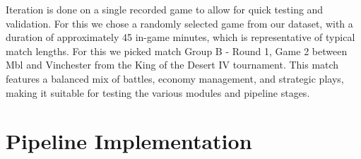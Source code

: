 Iteration is done on a single recorded game to allow for quick testing and validation. For this we chose a randomly selected game from our dataset, with a duration of approximately 45 in-game minutes, which is representative of typical match lengths. For this we picked match Group B - Round 1, Game 2 between Mbl and Vinchester from the King of the Desert IV tournament. This match features a balanced mix of battles, economy management, and strategic plays, making it suitable for testing the various modules and pipeline stages.



\section{Pipeline Implementation}\label{sec:pipeline-implementation}

